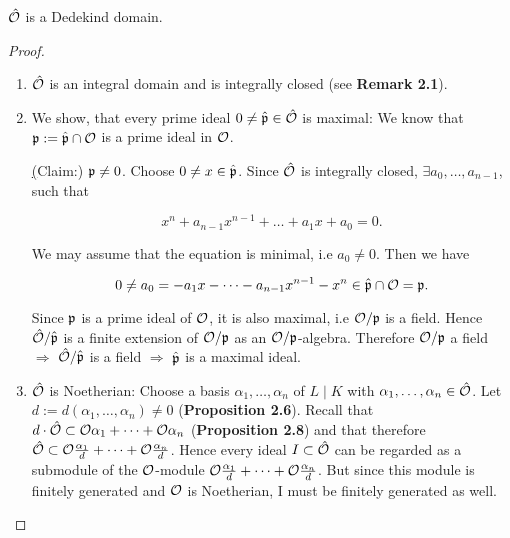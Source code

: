 \begin{Prop}
	$\hat{\mathcal{O}}$ is a Dedekind domain.
\end{Prop}
\begin{proof}
	\begin{enumerate}[(1)]
		\item $\hat{\mathcal{O}}$ is an integral domain and is integrally closed (see \textbf{Remark 2.1}).
		
		\item We show, that every prime ideal $0 \neq \hat{\mathfrak{p}} \in \hat{\mathcal{O}}$ is maximal:
		We know that $\mathfrak{p} := \hat{\mathfrak{p}} \cap \mathcal{O}$ is a prime ideal in $\mathcal{O}$.
		
		\underline(Claim:) $\mathfrak{p} \neq 0$. Choose $0 \neq x \in \hat{\mathfrak{p}}$. Since $\hat{\mathcal{O}}$ is integrally closed, $\exists a_0, \dots, a_{n-1}$, such that
		
		\[ x^n + a_{n-1}x^{n-1}+ \dots +a_1x + a_0 = 0.	\]
		
		We may assume that the equation is minimal, i.e $a_0 \neq 0$. Then we have
		
		\[ 0 \neq a_0 = -a_1x - \dots - a_{n-1}x^{n-1} - x^n \in \hat{\mathfrak{p}} \cap \mathcal{O} = \mathfrak{p}.  \]
		
		Since $\mathfrak{p}$ is a prime ideal of $\mathcal{O}$, it is also maximal, i.e $\mathcal{O} / \mathfrak{p}$ is a field. Hence $\hat{\mathcal{O}} / \hat{\mathfrak{p}}$ is a finite extension of  $\mathcal{O}/\mathfrak{p}$ as an $\mathcal{O}/\mathfrak{p}$-algebra. Therefore $\mathcal{O}/\mathfrak{p}$ a field $\Rightarrow$ $\hat{\mathcal{O}}/\hat{\mathfrak{p}}$ is a field $\Rightarrow$ $\hat{\mathfrak{p}}$ is a maximal ideal.
		
		\item $\hat{\mathcal{O}}$ is Noetherian:
		Choose a basis $\alpha_1, \dots, \alpha_n$ of $L \mid K$ with $\alpha_1, \dots, \alpha_n \in \hat{\mathcal{O}}$. Let $d:=d(\alpha_1, \dots, \alpha_n) \neq 0$ (\textbf{Proposition 2.6}). Recall that $d \cdot \hat{\mathcal{O}} \subset \mathcal{O}\alpha_1+\dots+\mathcal{O}\alpha_n$ (\textbf{Proposition 2.8}) and that therefore $\hat{\mathcal{O}} \subset \mathcal{O}\frac{\alpha_1}{d} + \dots + \mathcal{O}\frac{\alpha_n}{d}$. Hence every ideal $I \subset \hat{\mathcal{O}}$ can be regarded as a submodule of the $\mathcal{O}$-module $\mathcal{O}\frac{\alpha_1}{d} + \dots + \mathcal{O}\frac{\alpha_n}{d}$. But since this module is finitely generated and $\mathcal{O}$ is Noetherian, I must be finitely generated as well.
	\end{enumerate}
\end{proof}

